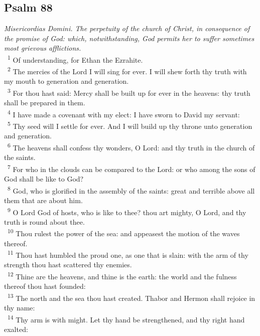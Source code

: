 \documentclass[a5paper,12pt]{article}
\begin{document}
\begin{multicols*}{2}
\section{Psalm 88}
\label{sec:org5e7430b}
\emph{Misericordias Domini. The perpetuity of the church of Christ, in consequence of the promise of God: which, notwithstanding, God permits her to suffer sometimes most grievous afflictions.}\\

~\textsuperscript{1} Of understanding, for Ethan the Ezrahite.\\
~\textsuperscript{2} The mercies of the Lord I will sing for ever. I will shew forth thy truth with my mouth to generation and generation.\\
~\textsuperscript{3} For thou hast said: Mercy shall be built up for ever in the heavens: thy truth shall be prepared in them.\\
~\textsuperscript{4} I have made a covenant with my elect: I have sworn to David my servant:\\
~\textsuperscript{5} Thy seed will I settle for ever. And I will build up thy throne unto generation and generation.\\
~\textsuperscript{6} The heavens shall confess thy wonders, O Lord: and thy truth in the church of the saints.\\
~\textsuperscript{7} For who in the clouds can be compared to the Lord: or who among the sons of God shall be like to God?\\
~\textsuperscript{8} God, who is glorified in the assembly of the saints: great and terrible above all them that are about him.\\
~\textsuperscript{9} O Lord God of hosts, who is like to thee? thou art mighty, O Lord, and thy truth is round about thee.\\
~\textsuperscript{10} Thou rulest the power of the sea: and appeasest the motion of the waves thereof.\\
~\textsuperscript{11} Thou hast humbled the proud one, as one that is slain: with the arm of thy strength thou hast scattered thy enemies.\\
~\textsuperscript{12} Thine are the heavens, and thine is the earth: the world and the fulness thereof thou hast founded:\\
~\textsuperscript{13} The north and the sea thou hast created. Thabor and Hermon shall rejoice in thy name:\\
~\textsuperscript{14} Thy arm is with might. Let thy hand be strengthened, and thy right hand exalted:\\

\end{multicols*}
\end{document}
